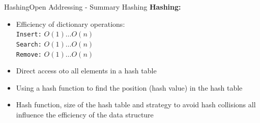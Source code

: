 
\begin{frame}{Hashing}{Open Addressing - Summary Hashing}
  \textbf{Hashing:}
  \begin{itemize}
    \item<2->
      Efficiency of dictionary operations:\\
      \hspace{1.5em}\texttt{Insert:} $O(1) \dots O(n)$\\
      \hspace{1.5em}\texttt{Search:} $O(1) \dots O(n)$\\
      \hspace{1.5em}\texttt{Remove:} $O(1) \dots O(n)$
    \item<3->
      Direct access oto all elements in a hash table 
    \item<4->
      Using a hash function to find the position (hash value) in the hash table
    \item<5->
      Hash function, size of the hash table and strategy to
      avoid hash collisions all influence the efficiency of the
      data structure
  \end{itemize}
\end{frame}
